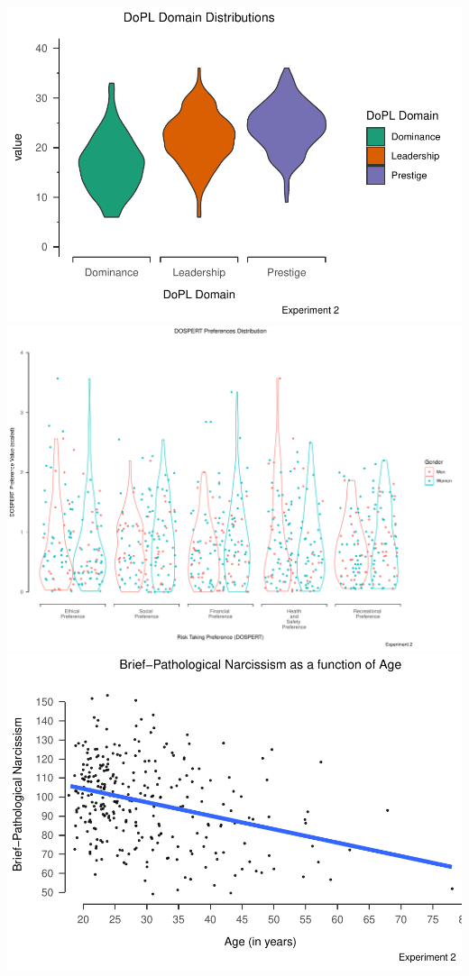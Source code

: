 \documentclass[
  donotrepeattitle,doc, 12pt, a4paper,floatsintext]{apa7}
\begin{document}
\includegraphics{Output_Files/DoPL-Experiment_files/figure-latex/DoPLDomainsExperiment2-1.pdf}
\includegraphics{Output_Files/DoPL-Experiment_files/figure-latex/DOSPERT-Preferences-GenderExperiment2-1.pdf}
\includegraphics{Output_Files/DoPL-Experiment_files/figure-latex/Experiment-2-PNI-distribution-1.pdf}
\newpage
\end{document}
